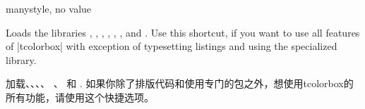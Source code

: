 














\begin{docTcbKey}[library]{many}{}{style, no value}

Loads the libraries , , , ,
, , and .
Use this shortcut, if you want to use all features of |tcolorbox|
with exception of typesetting listings and using
the specialized  library.

加载、、、、%
、 和 .%
如果你除了排版代码和使用专门的包之外，想使用tcolorbox的所有功能，请使用这个快捷选项。

\end{docTcbKey}









